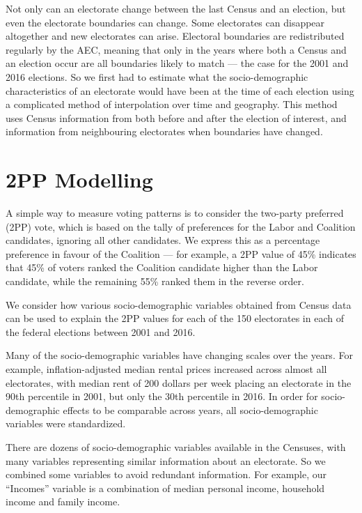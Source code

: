 \documentclass[11pt,a4paper,]{article}
\begin{document}
Not only can an electorate change between the last Census and an election, but even the electorate boundaries can change. Some electorates can disappear altogether and new electorates can arise. Electoral boundaries are redistributed regularly by the AEC, meaning that only in the years where both a Census and an election occur are all boundaries likely to match --- the case for the 2001 and 2016 elections. So we first had to estimate what the socio-demographic characteristics of an electorate would have been at the time of each election using a complicated method of interpolation over time and geography. This method uses Census information from both before and after the election of interest, and information from neighbouring electorates when boundaries have changed.

\hypertarget{modelling}{%
\section{2PP Modelling}\label{modelling}}

A simple way to measure voting patterns is to consider the two-party preferred (2PP) vote, which is based on the tally of preferences for the Labor and Coalition candidates, ignoring all other candidates. We express this as a percentage preference in favour of the Coalition --- for example, a 2PP value of 45\% indicates that 45\% of voters ranked the Coalition candidate higher than the Labor candidate, while the remaining 55\% ranked them in the reverse order.

We consider how various socio-demographic variables obtained from Census data can be used to explain the 2PP values for each of the 150 electorates in each of the federal elections between 2001 and 2016.

Many of the socio-demographic variables have changing scales over the years. For example, inflation-adjusted median rental prices increased across almost all electorates, with median rent of 200 dollars per week placing an electorate in the 90th percentile in 2001, but only the 30th percentile in 2016. In order for socio-demographic effects to be comparable across years, all socio-demographic variables were standardized.

There are dozens of socio-demographic variables available in the Censuses, with many variables representing similar information about an electorate. So we combined some variables to avoid redundant information. For example, our ``Incomes'' variable is a combination of median personal income, household income and family income.
\end{document}

